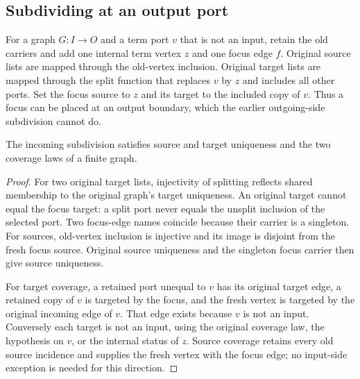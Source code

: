 \subsection{Subdividing at an output port}
\begin{definition}\label{term:output-focus-insertion}
For a graph $G:I\to O$ and a term port $v$ that is not an input, retain the old
carriers and add one internal term vertex $z$ and one focus edge $f$. Original
source lists are mapped through the old-vertex inclusion. Original target lists
are mapped through the split function that replaces $v$ by $z$ and includes
all other ports. Set the focus source to $z$ and its target to the included
copy of $v$. Thus a focus can be placed at an output boundary, which the earlier
outgoing-side subdivision cannot do.
\end{definition}
\begin{lemma}
The incoming subdivision satisfies source and target uniqueness and the two
coverage laws of a finite graph.
\end{lemma}
\begin{proof}
For two original target lists, injectivity of splitting reflects shared
membership to the original graph's target uniqueness. An original target
cannot equal the focus target: a split port never equals the unsplit inclusion
of the selected port. Two focus-edge names coincide because their carrier is a
singleton. For sources, old-vertex inclusion is injective and its image is
disjoint from the fresh focus source. Original source uniqueness and the
singleton focus carrier then give source uniqueness.

For target coverage, a retained port unequal to $v$ has its original target
edge, a retained copy of $v$ is targeted by the focus, and the fresh vertex is
targeted by the original incoming edge of $v$. That edge exists because $v$
is not an input. Conversely each target is not an input, using the original
coverage law, the hypothesis on $v$, or the internal status of $z$. Source
coverage retains every old source incidence and supplies the fresh vertex
with the focus edge; no input-side exception is needed for this direction.
\end{proof}
